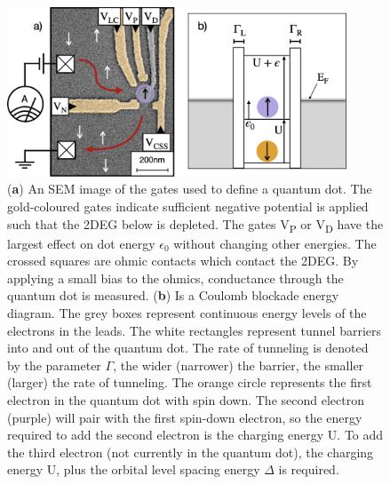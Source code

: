 \begin{figure}[!htb]
 \begin{center}
  \includegraphics[width=0.9\textwidth]{figures/ch1/crop_FiguresMaster.004.png}
  \caption[Quantum dot energy levels]{\label{fig:ch1/dot_energy_levels} 
  (\textbf{a}) An SEM image of the gates used to define a quantum dot. The gold-coloured gates indicate sufficient negative potential is applied such that the 2DEG below is depleted. The gates V\textsubscript{P} or V\textsubscript{D} have the largest effect on dot energy $\epsilon_0$ without changing other energies. The crossed squares are ohmic contacts which contact the 2DEG. By applying a small bias to the ohmics, conductance through the quantum dot is measured. (\textbf{b}) Is a Coulomb blockade energy diagram. The grey boxes represent continuous energy levels of the electrons in the leads. The white rectangles represent tunnel barriers into and out of the quantum dot. The rate of tunneling is denoted by the parameter $\Gamma$, the wider (narrower) the barrier, the smaller (larger) the rate of tunneling. The orange circle represents the first electron in the quantum dot with spin down. The second electron (purple) will pair with the first spin-down electron, so the energy required to add the second electron is the charging energy $\mathrm{U}$. To add the third electron (not currently in the quantum dot), the charging energy $\mathrm{U}$, plus the orbital level spacing energy $\Delta$ is required.}
 \end{center}
\end{figure}


